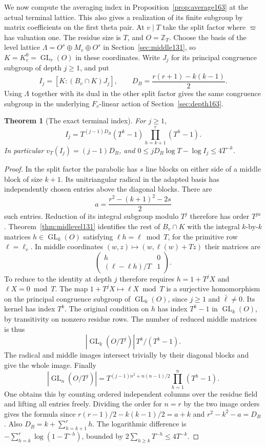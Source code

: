 \documentclass[a4paper,11pt]{article}
\newtheorem{theorem}[proposition]{Theorem}
\theoremstyle{definition}
\theoremstyle{remark}
\newcommand{\ZZ}{\mathbb Z}\newcommand{\ord}{\operatorname{ord}}
\numberwithin{equation}{section}
\newcommand{\GL}{\operatorname{GL}}
\begin{document}
We now compute the averaging index in
Proposition~\ref{prop:average163} at the actual terminal lattice.
This also gives a realization of its finite subgroup by matrix
coefficients on the first theta pair. At \(v\mid T\) take the
split factor where \(\varpi\) has valuation one. The residue size
is \(T\), and \(O=\ZZ_T\). Choose the basis of the level lattice
\(\Lambda=O^s\oplus M_v\oplus O^s\) in Section~\ref{sec:middle131},
so \(K=K^0_v=\GL_r(O)\) in these coordinates. Write \(J_j\) for
its principal congruence subgroup of depth \(j\ge1\), and put
\[
    I_j=[K:(B_v\cap K)J_j],\qquad
    D_B=\frac{r(r+1)-k(k-1)}2 .
\]
Using \(\Lambda\) together with its dual in the other split
factor gives the same congruence subgroup in the underlying
\(F_v\)-linear action of Section~\ref{sec:depth163}.

\begin{theorem}[The exact terminal index]\label{thm:index165}
For \(j\ge1\),
\[
    I_j=T^{(j-1)D_B}(T^k-1)\prod_{h=k+1}^{r}(T^h-1).
\]
In particular \(v_T(I_j)=(j-1)D_B\), and
\(0\le jD_B\log T-\log I_j\le 4T^{-k}\).
\end{theorem}
\begin{proof}
In the split factor the parabolic has \(s\) line blocks on either
side of a middle block of size \(k+1\). Its unitriangular radical
in the adapted basis has independently chosen entries above the
diagonal blocks. There are
\[
               a=\frac{r^2-(k+1)^2-2s}{2}
\]
such entries. Reduction of its integral subgroup modulo \(T^j\)
therefore has order \(T^{ja}\). Theorem~\ref{thm:midlevel131}
identifies the rest of \(B_v\cap K\) with the integral
\(k\)-by-\(k\) matrices \(h\in\GL_k(O)\) satisfying
\(\ell h=\ell\bmod T\), for the primitive row \(\ell=\ell_v\).
In middle coordinates \((w,z)\mapsto(w,\ell(w)+Tz)\) their
matrices are
\[
                  \begin{pmatrix}h&0\\(\ell-\ell h)/T&1\end{pmatrix}.
\]
To reduce to the identity at depth \(j\) therefore requires
\(h=1+T^j X\) and \(\ell X=0\bmod T\). The map \(1+T^jX\mapsto
\ell X\bmod T\) is a surjective homomorphism on the principal
congruence subgroup of \(\GL_k(O)\), since \(j\ge1\) and
\(\bar\ell\ne0\). Its kernel has index \(T^k\). The original
condition on \(h\) has index \(T^k-1\) in \(\GL_k(O)\), by
transitivity on nonzero residue rows. The number of reduced
middle matrices is thus
\[
         |\GL_k(O/T^j)|\,T^k/(T^k-1).
\]
The radical and middle images intersect trivially by their
diagonal blocks and give the whole image. Finally
\[
 |\GL_n(O/T^j)|=T^{(j-1)n^2+n(n-1)/2}
                           \prod_{h=1}^n(T^h-1).
\]
One obtains this by counting ordered independent columns over
the residue field and lifting all entries freely. Dividing
the order for \(n=r\) by the two image orders gives the formula since
\(r(r-1)/2-k(k-1)/2=a+k\) and \(r^2-k^2-a=D_B\).
Also \(D_B=k+\sum_{h=k+1}^r h\). The logarithmic difference
is \(-\sum_{h=k}^r\log(1-T^{-h})\), bounded by
\(2\sum_{h\ge k}T^{-h}\le4T^{-k}\).
\end{proof}
\end{document}
